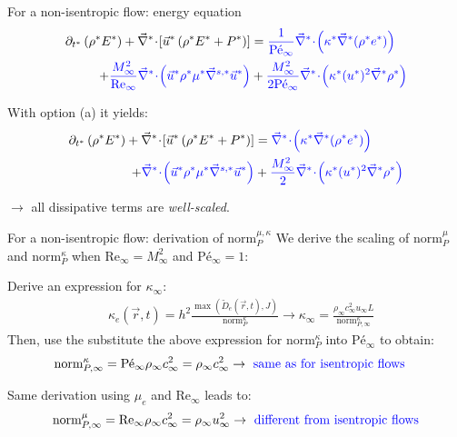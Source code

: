 \documentclass[xcolor=dvipsnames,10pt]{beamer}
\renewcommand{\Re}{\textrm{Re}}
\newcommand{\Pe}{\textrm{P\'e}}
\newcommand{\divv}[1]{\vec{\nabla}^{#1}\! \cdot \!}
\newcommand{\gradd}[1]{\vec{\nabla}^{#1}}
\newcommand{\norm}{\textrm{norm}}
\begin{document}
\begin{frame}{For a non-isentropic flow: energy equation}
\begin{align}
\partial_{t^*} \left( \rho^* E^* \right) 
+ \divv{*}  \left[ \vec{u}^* \left( \rho^* E^* + P^* \right) \right] 
&=
\textcolor{blue}{\frac{1}{\Pe_\infty} \divv{*}  \left( \kappa^*  \gradd{*} (\rho^* e^*) \right)} \nonumber  \\
+
\textcolor{blue}{\frac{M_\infty^2}{\Re_\infty} \divv{*}  \left( \vec{u}^* \rho^* \mu^* \gradd{s,*} \vec{u}^* \right)}
&+ 
\textcolor{blue}{\frac{M_\infty^2}{2 \Pe_\infty} \divv{*}  \left(\kappa^* (u^*)^2 \gradd{*} \rho^* \right)} \nonumber
\end{align}
\begin{block}{With option (a) it yields:}
\begin{align}
\partial_{t^*} \left( \rho^* E^* \right) 
+ \divv{*}  \left[ \vec{u}^* \left( \rho^* E^* + P^* \right) \right] 
&=
\textcolor{blue}{ \divv{*}  \left( \kappa^*  \gradd{*} (\rho^* e^*) \right)} \nonumber  \\
+
\textcolor{blue}{ \divv{*}  \left( \vec{u}^* \rho^* \mu^* \gradd{s,*} \vec{u}^* \right)}
&+ 
\textcolor{blue}{\frac{M_\infty^2}{2} \divv{*}  \left(\kappa^* (u^*)^2 \gradd{*} \rho^* \right)} \nonumber
\end{align}
\end{block}
$\to$ all dissipative terms are \emph{well-scaled}.
\end{frame}
\begin{frame}{For a non-isentropic flow: derivation of $\norm_P^{\mu, \kappa}$ }
We derive the scaling of $\norm_P^\mu$ and $\norm_P^\kappa$ when $\Re_\infty = M_\infty^2$ and $\Pe_\infty = 1$:
\begin{block}{}
Derive an expression for $\kappa_\infty$:
\begin{align}
&\kappa_e(\vec{r},t) = h^2 \frac{\max \left( \tilde{D}_e(\vec{r},t), J \right)}{\norm_P^\kappa} \longrightarrow \kappa_\infty = \frac{ \rho_\infty c_\infty^2 u_\infty L }{ \norm_{P,\infty}^\kappa } \nonumber 
\end{align}
Then, use the substitute the above expression for $\norm_P^\kappa$ into $\Pe_\infty$ to obtain:
\begin{align}
&\norm_{P,\infty}^{\kappa} = \Pe_\infty \rho_\infty c_\infty^2 = \rho_\infty c_\infty^2 \to \text{\color{blue}{ same as for isentropic flows}}\nonumber
\end{align}
\end{block}
\begin{block}{}
Same derivation using $\mu_e$ and $\Re_\infty$ leads to:
\begin{align}
\norm_{P,\infty}^{\mu} = \Re_\infty \rho_\infty c_\infty^2 = \rho_\infty u_\infty^2 \to \text{\color{blue}{ different from isentropic flows}}\nonumber
\end{align}
\end{block}
\end{frame}
\end{document}
